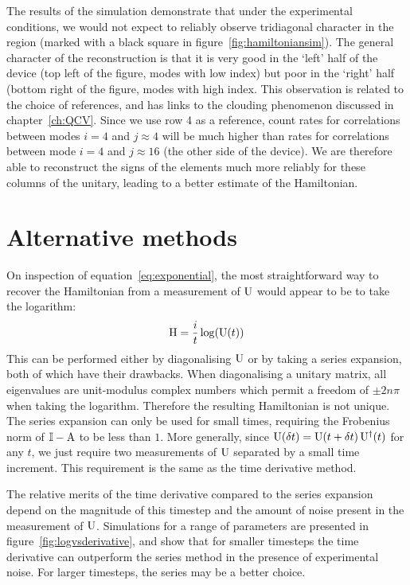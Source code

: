 The results of the simulation demonstrate that under the experimental
conditions, we would not expect to reliably observe tridiagonal character in the
region (marked with a black square in figure~\ref{fig:hamiltoniansim}). The
general character of the reconstruction is that it is very good in the `left'
half of the device (top left of the figure, modes with low index) but poor in
the `right' half (bottom right of the figure, modes with high index. This
observation is related to the choice of references, and has links to the
clouding phenomenon discussed in chapter~\ref{ch:QCV}. Since we use row 4 as a
reference, count rates for correlations between modes \(i=4\) and \(j \approx
4\) will be much higher than rates for correlations between mode \(i=4\) and \(j
\approx 16\) (the other side of the device). We are therefore able to
reconstruct the signs of the elements much more reliably for these columns of
the unitary, leading to a better estimate of the Hamiltonian.

\section{Alternative methods}
\label{sec:Alternatives}
On inspection of equation~\ref{eq:exponential}, the most straightforward way to
recover the Hamiltonian from a measurement of \(\mathrm{U}\) would appear to be to
take the logarithm:
\begin{equation}
  \mathrm{H} = \frac{i}{t} \log \!\left(\mathrm{U} \!\left(t\right)\right)
\end{equation}
This can be performed either by diagonalising \(\mathrm{U}\) or by taking a series
expansion, both of which have their drawbacks. When diagonalising a unitary
matrix, all eigenvalues are unit-modulus complex numbers which permit a freedom
of \(\pm 2 n \pi\) when taking the logarithm. Therefore the resulting
Hamiltonian is not unique. The series expansion can only be used for small
times, requiring the Frobenius norm of \(\mathbb{I}-\mathrm{A}\) to be less than
\(1\). More generally, since \(\mathrm{U} \!\left(\delta t\right) = \mathrm{U} \!\left(t+\delta t\right)
\mathrm{U}^{\dagger} \!\left(t\right)\) for any \(t\), we just require two measurements of
\(\mathrm{U}\) separated by a small time increment. This requirement is the same as
the time derivative method.

The relative merits of the time derivative compared to the series expansion
depend on the magnitude of this timestep and the amount of noise present in the
measurement of \(\mathrm{U}\). Simulations for a range of parameters are presented
in figure~\ref{fig:logvsderivative}, and show that for smaller timesteps the
time derivative can outperform the series method in the presence of experimental
noise. For larger timesteps, the series may be a better choice.

